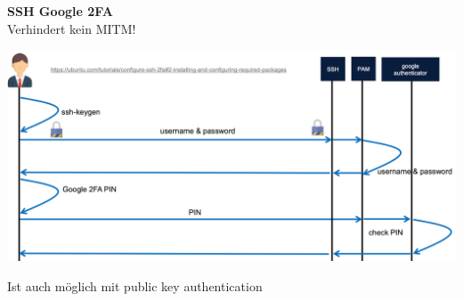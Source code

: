 \textbf{SSH Google 2FA}\\
Verhindert kein MITM!
\begin{center}
    \vspace{-8pt}
    \includegraphics[width=.8\linewidth]{./img/09-mitm/ssh_2fa}
    \vspace{-8pt}
\end{center}
Ist auch möglich mit public key authentication

